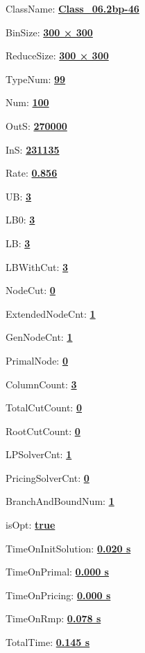 \documentclass[11pt]{article}
\begin{document}
\pagestyle{empty}


ClassName: \underline{\textbf{Class_06.2bp-46}}
\par
BinSize: \underline{\textbf{300 × 300}}
\par
ReduceSize: \underline{\textbf{300 × 300}}
\par
TypeNum: \underline{\textbf{99}}
\par
Num: \underline{\textbf{100}}
\par
OutS: \underline{\textbf{270000}}
\par
InS: \underline{\textbf{231135}}
\par
Rate: \underline{\textbf{0.856}}
\par
UB: \underline{\textbf{3}}
\par
LB0: \underline{\textbf{3}}
\par
LB: \underline{\textbf{3}}
\par
LBWithCut: \underline{\textbf{3}}
\par
NodeCut: \underline{\textbf{0}}
\par
ExtendedNodeCnt: \underline{\textbf{1}}
\par
GenNodeCnt: \underline{\textbf{1}}
\par
PrimalNode: \underline{\textbf{0}}
\par
ColumnCount: \underline{\textbf{3}}
\par
TotalCutCount: \underline{\textbf{0}}
\par
RootCutCount: \underline{\textbf{0}}
\par
LPSolverCnt: \underline{\textbf{1}}
\par
PricingSolverCnt: \underline{\textbf{0}}
\par
BranchAndBoundNum: \underline{\textbf{1}}
\par
isOpt: \underline{\textbf{true}}
\par
TimeOnInitSolution: \underline{\textbf{0.020 s}}
\par
TimeOnPrimal: \underline{\textbf{0.000 s}}
\par
TimeOnPricing: \underline{\textbf{0.000 s}}
\par
TimeOnRmp: \underline{\textbf{0.078 s}}
\par
TotalTime: \underline{\textbf{0.145 s}}
\par
\newpage
\end{document}

